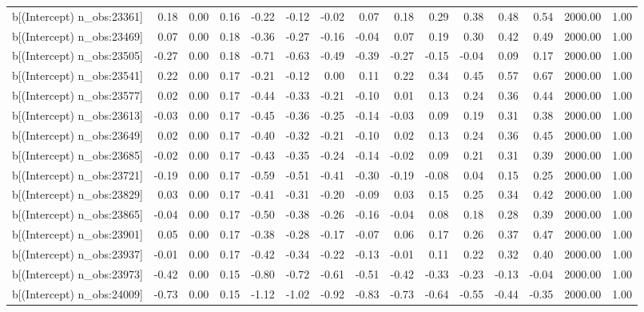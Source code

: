 \begin{table}[ht]
\begin{tabular}{rrrrrrrrrrrrrrr}
  b[(Intercept) n\_obs:23361] & 0.18 & 0.00 & 0.16 & -0.22 & -0.12 & -0.02 & 0.07 & 0.18 & 0.29 & 0.38 & 0.48 & 0.54 & 2000.00 & 1.00 \\ 
  b[(Intercept) n\_obs:23469] & 0.07 & 0.00 & 0.18 & -0.36 & -0.27 & -0.16 & -0.04 & 0.07 & 0.19 & 0.30 & 0.42 & 0.49 & 2000.00 & 1.00 \\ 
  b[(Intercept) n\_obs:23505] & -0.27 & 0.00 & 0.18 & -0.71 & -0.63 & -0.49 & -0.39 & -0.27 & -0.15 & -0.04 & 0.09 & 0.17 & 2000.00 & 1.00 \\ 
  b[(Intercept) n\_obs:23541] & 0.22 & 0.00 & 0.17 & -0.21 & -0.12 & 0.00 & 0.11 & 0.22 & 0.34 & 0.45 & 0.57 & 0.67 & 2000.00 & 1.00 \\ 
  b[(Intercept) n\_obs:23577] & 0.02 & 0.00 & 0.17 & -0.44 & -0.33 & -0.21 & -0.10 & 0.01 & 0.13 & 0.24 & 0.36 & 0.44 & 2000.00 & 1.00 \\ 
  b[(Intercept) n\_obs:23613] & -0.03 & 0.00 & 0.17 & -0.45 & -0.36 & -0.25 & -0.14 & -0.03 & 0.09 & 0.19 & 0.31 & 0.38 & 2000.00 & 1.00 \\ 
  b[(Intercept) n\_obs:23649] & 0.02 & 0.00 & 0.17 & -0.40 & -0.32 & -0.21 & -0.10 & 0.02 & 0.13 & 0.24 & 0.36 & 0.45 & 2000.00 & 1.00 \\ 
  b[(Intercept) n\_obs:23685] & -0.02 & 0.00 & 0.17 & -0.43 & -0.35 & -0.24 & -0.14 & -0.02 & 0.09 & 0.21 & 0.31 & 0.39 & 2000.00 & 1.00 \\ 
  b[(Intercept) n\_obs:23721] & -0.19 & 0.00 & 0.17 & -0.59 & -0.51 & -0.41 & -0.30 & -0.19 & -0.08 & 0.04 & 0.15 & 0.25 & 2000.00 & 1.00 \\ 
  b[(Intercept) n\_obs:23829] & 0.03 & 0.00 & 0.17 & -0.41 & -0.31 & -0.20 & -0.09 & 0.03 & 0.15 & 0.25 & 0.34 & 0.42 & 2000.00 & 1.00 \\ 
  b[(Intercept) n\_obs:23865] & -0.04 & 0.00 & 0.17 & -0.50 & -0.38 & -0.26 & -0.16 & -0.04 & 0.08 & 0.18 & 0.28 & 0.39 & 2000.00 & 1.00 \\ 
  b[(Intercept) n\_obs:23901] & 0.05 & 0.00 & 0.17 & -0.38 & -0.28 & -0.17 & -0.07 & 0.06 & 0.17 & 0.26 & 0.37 & 0.47 & 2000.00 & 1.00 \\ 
  b[(Intercept) n\_obs:23937] & -0.01 & 0.00 & 0.17 & -0.42 & -0.34 & -0.22 & -0.13 & -0.01 & 0.11 & 0.22 & 0.32 & 0.40 & 2000.00 & 1.00 \\ 
  b[(Intercept) n\_obs:23973] & -0.42 & 0.00 & 0.15 & -0.80 & -0.72 & -0.61 & -0.51 & -0.42 & -0.33 & -0.23 & -0.13 & -0.04 & 2000.00 & 1.00 \\ 
  b[(Intercept) n\_obs:24009] & -0.73 & 0.00 & 0.15 & -1.12 & -1.02 & -0.92 & -0.83 & -0.73 & -0.64 & -0.55 & -0.44 & -0.35 & 2000.00 & 1.00 \\ 

\end{tabular}
\end{table}
